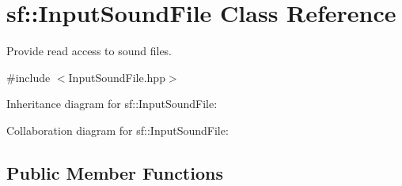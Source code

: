 \hypertarget{classsf_1_1_input_sound_file}{}\section{sf\+:\+:Input\+Sound\+File Class Reference}
\label{classsf_1_1_input_sound_file}


Provide read access to sound files.  




{\ttfamily \#include $<$Input\+Sound\+File.\+hpp$>$}



Inheritance diagram for sf\+:\+:Input\+Sound\+File\+:


Collaboration diagram for sf\+:\+:Input\+Sound\+File\+:
\subsection*{Public Member Functions}
